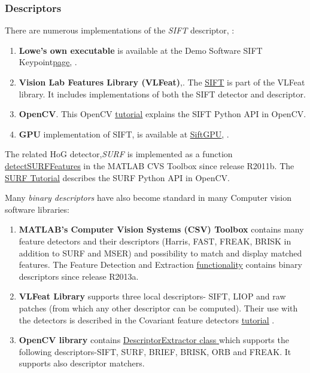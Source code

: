 {\subsubsection{Descriptors}\label{soft:salregdescr:subsec}

There are numerous implementations of the {\em SIFT} descriptor, \cite{Lowe:2004}:
\begin{enumerate}
\item{\bf Lowe's own executable} is available at the Demo Software SIFT Keypoint\href{http://www.cs.ubc.ca/~lowe/keypoints/}{\underline{page}}, \cite{lowe_sift_soft}.
\item{\bf Vision Lab Features Library (VLFeat)},\cite{vlfeat_soft}. The \href{http://www.vlfeat.org/api/sift.html}{\underline{SIFT}} is part of the VLFeat library. It includes implementations of both the SIFT detector and descriptor.
\item{\bf OpenCV}. This OpenCV \href{http://docs.opencv.org/master/da/df5/tutorial_py_sift_intro.html}{\underline{tutorial}} explains the SIFT Python API in OpenCV.
\item{\bf GPU} implementation of SIFT, \cite{Sinha06gpu-basedvideo} is available at \href{http://cs.unc.edu/~ccwu/siftgpu/}{\underline{SiftGPU}}, \cite{sift_gpu_soft}. 
\end{enumerate}

The related HoG detector,{\em SURF}  is implemented as a function \href{http://nl.mathworks.com/help/vision/ref/detectsurffeatures.html}{\underline{\textsf{detectSURFFeatures}}} in the MATLAB CVS Toolbox since release R2011b. The \href{http://docs.opencv.org/master/df/dd2/tutorial_py_surf_intro.html}{\underline{SURF Tutorial}} describes the SURF Python API in OpenCV.

Many {\em binary descriptors} have also become standard in many Computer vision software libraries:
\begin{enumerate}
\item{{\bf MATLAB's Computer Vision Systems (CSV) Toolbox} contains many feature detectors and their descriptors (Harris, FAST, FREAK, BRISK in addition to SURF and MSER) and possibility to match and display matched features. The Feature Detection and Extraction \href{http://nl.mathworks.com/help/vision/feature-detection-extraction-and-matching.html}{\underline{functionality}} contains binary descriptors since release R2013a.}
\item{ {\bf VLFeat Library} supports three local descriptors- SIFT, LIOP and raw patches (from which any other descriptor can be computed). Their use with the  detectors is described in the Covariant feature detectors \href{http://www.vlfeat.org/overview/covdet.html}{\underline{tutorial}} }. 
\item{ {\bf OpenCV library} contains \href{http://docs.opencv.org/modules/features2d/doc/common_interfaces_of_descriptor_extractors.html?highlight=descriptorextractor#descriptorextractor}{\underline{\textsf{DescriptorExtractor class}} } which supports the following descriptors-SIFT, SURF, BRIEF, BRISK, ORB and FREAK. It supports also descriptor matchers.}
\end{enumerate}

}
